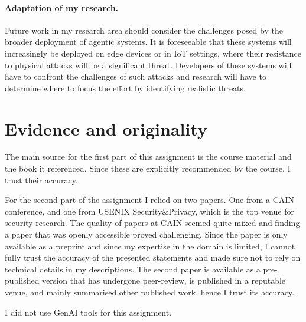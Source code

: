 \documentclass{article}
\begin{document}
\paragraph{Adaptation of my research.}

Future work in my research area should consider the challenges posed by the broader deployment of agentic systems. It is foreseeable that these systems will increasingly be deployed on edge devices or in IoT settings, where their resistance to physical attacks will be a significant threat. Developers of these systems will have to confront the challenges of such attacks and research will have to determine where to focus the effort by identifying realistic threats.

\section{Evidence and originality}

The main source for the first part of this assignment is the course material and the book it referenced. Since these are explicitly recommended by the course, I trust their accuracy.

For the second part of the assignment I relied on two papers. One from a CAIN conference, and one from USENIX Security\&Privacy, which is the top venue for security research. The quality of papers at CAIN seemed quite mixed and finding a paper that was openly accessible proved challenging. Since the paper is only available as a preprint and since my expertise in the domain is limited, I cannot fully trust the accuracy of the presented statements and made sure not to rely on technical details in my descriptions. The second paper is available as a pre-published version that has undergone peer-review, is published in a reputable venue, and mainly summarised other published work, hence I trust its accuracy.

I did not use GenAI tools for this assignment.

\printbibliography
\end{document}
